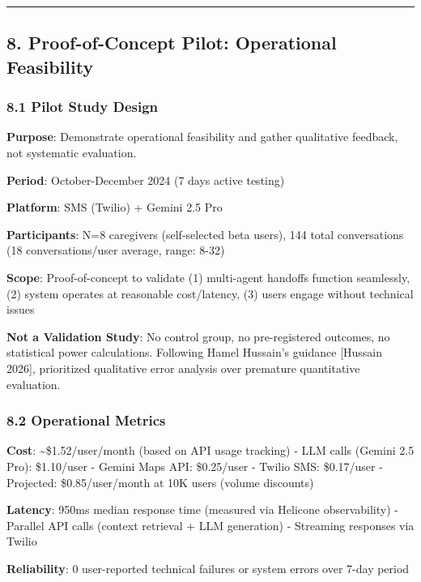 \documentclass[
]{article}
\begin{document}
\begin{center}\rule{0.5\linewidth}{0.5pt}\end{center}

\subsection{8. Proof-of-Concept Pilot: Operational
Feasibility}\label{proof-of-concept-pilot-operational-feasibility}

\subsubsection{8.1 Pilot Study Design}\label{pilot-study-design}

\textbf{Purpose}: Demonstrate operational feasibility and gather
qualitative feedback, not systematic evaluation.

\textbf{Period}: October-December 2024 (7 days active testing)

\textbf{Platform}: SMS (Twilio) + Gemini 2.5 Pro

\textbf{Participants}: N=8 caregivers (self-selected beta users), 144
total conversations (18 conversations/user average, range: 8-32)

\textbf{Scope}: Proof-of-concept to validate (1) multi-agent handoffs
function seamlessly, (2) system operates at reasonable cost/latency, (3)
users engage without technical issues

\textbf{Not a Validation Study}: No control group, no pre-registered
outcomes, no statistical power calculations. Following Hamel Hussain's
guidance {[}Hussain 2026{]}, prioritized qualitative error analysis over
premature quantitative evaluation.

\subsubsection{8.2 Operational Metrics}\label{operational-metrics}

\textbf{Cost}: \textasciitilde\$1.52/user/month (based on API usage
tracking) - LLM calls (Gemini 2.5 Pro): \$1.10/user - Gemini Maps API:
\$0.25/user - Twilio SMS: \$0.17/user - Projected: \$0.85/user/month at
10K users (volume discounts)

\textbf{Latency}: 950ms median response time (measured via Helicone
observability) - Parallel API calls (context retrieval + LLM generation)
- Streaming responses via Twilio

\textbf{Reliability}: 0 user-reported technical failures or system
errors over 7-day period
\end{document}
